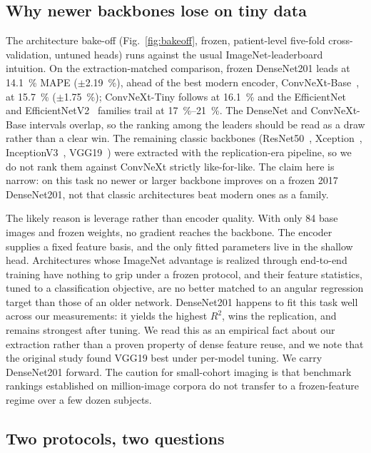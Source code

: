 \subsection{Why newer backbones lose on tiny data}

The architecture bake-off (Fig.~\ref{fig:bakeoff}, frozen, patient-level five-fold
cross-validation, untuned heads) runs against the usual ImageNet-leaderboard
intuition. On the extraction-matched comparison, frozen DenseNet201 leads at
\SI{14.1}{\percent} MAPE ($\pm$\SI{2.19}{\percent}), ahead of the best modern
encoder, ConvNeXt-Base~\citep{Liu2022}, at \SI{15.7}{\percent}
($\pm$\SI{1.75}{\percent}); ConvNeXt-Tiny follows at \SI{16.1}{\percent} and the
EfficientNet and EfficientNetV2~\citep{Tan2019} families trail at
\SIrange{17}{21}{\percent}. The DenseNet and ConvNeXt-Base intervals overlap, so
the ranking among the leaders should be read as a draw rather than a clear win.
The remaining classic backbones (ResNet50~\citep{He2016},
Xception~\citep{Chollet2017}, InceptionV3~\citep{Szegedy2016},
VGG19~\citep{Simonyan2015}) were extracted with the replication-era pipeline, so we
do not rank them against ConvNeXt strictly like-for-like. The claim here is narrow:
on this task no newer or larger backbone improves on a frozen 2017 DenseNet201, not
that classic architectures beat modern ones as a family.

The likely reason is leverage rather than encoder quality. With only \num{84} base
images and frozen weights, no gradient reaches the backbone. The encoder supplies a
fixed feature basis, and the only fitted parameters live in the shallow head.
Architectures whose ImageNet advantage is realized through end-to-end training have
nothing to grip under a frozen protocol, and their feature statistics, tuned to a
classification objective, are no better matched to an angular regression target than
those of an older network. DenseNet201 happens to fit this task well across our
measurements: it yields the highest $R^2$, wins the replication, and remains
strongest after tuning. We read this as an empirical fact about our extraction
rather than a proven property of dense feature reuse, and we note that the original
study found VGG19 best under per-model tuning. We carry DenseNet201 forward. The
caution for small-cohort imaging is that benchmark rankings established on
million-image corpora do not transfer to a frozen-feature regime over a few dozen
subjects.

\subsection{Two protocols, two questions}

